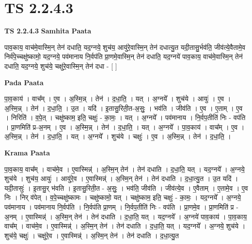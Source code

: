 \documentclass[17pt]{extarticle}
\begin{document}
\section*{ TS 2.2.4.3 }

\textbf{TS 2.2.4.3 } \newline
\textbf{Samhita Paata} \newline

पाव॒काय॒ वाच॑मे॒वास्मि॒न् तेन॑ दधाति॒ यद॒ग्नये॒ शुच॑य॒ आयु॑रे॒वास्मि॒न् तेन॑ दधात्यु॒त यदी॒तासु॒र्भव॑ति॒ जीव॑त्ये॒वैतामे॒व निर्व॑पे॒च्चक्षु॑ष्कामो॒ यद॒ग्नये॒ पव॑मानाय नि॒र्वप॑ति प्रा॒णमे॒वास्मि॒न् तेन॑ दधाति॒ यद॒ग्नये॑ पाव॒काय॒ वाच॑मे॒वास्मि॒न् तेन॑ दधाति॒ यद॒ग्नये॒ शुच॑ये॒ चक्षु॑रे॒वास्मि॒न् तेन॑ दधा - [  ] \newline

\textbf{Pada Paata} \newline

पा॒व॒काय॑ । वाच᳚म् । ए॒व । अ॒स्मि॒न्न् । तेन॑ । द॒धा॒ति॒ । यत् । अ॒ग्नये᳚ । शुच॑ये । आयुः॑ । ए॒व । अ॒स्मि॒न्न् । तेन॑ । द॒धा॒ति॒ । उ॒त । यदि॑ । इ॒तासु॒रिती॒त-अ॒सुः॒ । भव॑ति । जीव॑ति । ए॒व । ए॒ताम् । ए॒व । निरिति॑ । व॒पे॒त् । चक्षु॑ष्काम॒ इति॒ चक्षुः॑ - का॒मः॒ । यत् । अ॒ग्नये᳚ । पव॑मानाय । नि॒र्वप॒तीति॑ निः - वप॑ति । प्रा॒णमिति॑ प्र-अ॒नम् । ए॒व । अ॒स्मि॒न्न् । तेन॑ । द॒धा॒ति॒ । यत् । अ॒ग्नये᳚ । पा॒व॒काय॑ । वाच᳚म् । ए॒व । अ॒स्मि॒न्न् । तेन॑ । द॒धा॒ति॒ । यत् । अ॒ग्नये᳚ । शुच॑ये । चक्षुः॑ । ए॒व । अ॒स्मि॒न्न् । तेन॑ । द॒धा॒ति॒ ।  \newline


\textbf{Krama Paata} \newline

पा॒व॒काय॒ वाच᳚म् । वाच॑मे॒व । ए॒वास्मिन्न्॑ । अ॒स्मि॒न् तेन॑ । तेन॑ दधाति । द॒धा॒ति॒ यत् । यद॒ग्नये᳚ । अ॒ग्नये॒ शुच॑ये । शुच॑य॒ आयुः॑ । आयु॑रे॒व । ए॒वास्मिन्न्॑ । अ॒स्मि॒न् तेन॑ । तेन॑ दधाति । द॒धा॒त्यु॒त । उ॒त यदि॑ । यदी॒तासुः॑ । इ॒तासु॒र् भ॑वति । इ॒तासु॒रिती॒त - अ॒सुः॒ । भव॑ति॒ जीव॑ति । जीव॑त्ये॒व । ए॒वैताम् । ए॒तामे॒व । ए॒व निः । निर् व॑पेत् । व॒पे॒च्चक्षु॑ष्कामः । चक्षु॑ष्कामो॒ यत् । चक्षु॑ष्काम॒ इति॒ चक्षुः॑ - का॒मः॒ । यद॒ग्नये᳚ । अ॒ग्नये॒ पव॑मानाय । पव॑मानाय नि॒र्वप॑ति । नि॒र्वप॑ति प्रा॒णम् । नि॒र्वप॒तीति॑ निः - वप॑ति । प्रा॒णमे॒व । प्रा॒णमिति॑ प्र - अ॒नम् । ए॒वास्मिन्न्॑ । अ॒स्मि॒न् तेन॑ । तेन॑ दधाति । द॒धा॒ति॒ यत् । यद॒ग्नये᳚ । अ॒ग्नये॑ पाव॒काय॑ । पा॒व॒काय॒ वाच᳚म् । वाच॑मे॒व । ए॒वास्मिन्न्॑ । अ॒स्मि॒न् तेन॑ । तेन॑ दधाति । द॒धा॒ति॒ यत् । यद॒ग्नये᳚ । अ॒ग्नये॒ शुच॑ये । शुच॑ये॒ चक्षुः॑ । चक्षु॑रे॒व । ए॒वास्मिन्न्॑ । अ॒स्मि॒न् तेन॑ । तेन॑ दधाति । द॒धा॒त्यु॒त \newline
\end{document}
